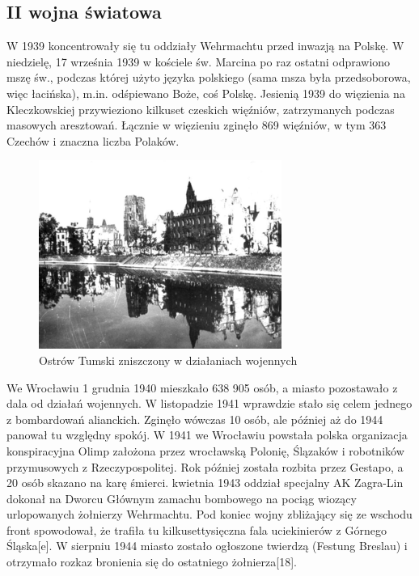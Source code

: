 \documentclass{article}
\begin{document}
\subsection{II wojna światowa}
W 1939 koncentrowały się tu oddziały Wehrmachtu przed inwazją na Polskę.
\bigskip
\newline
W niedzielę, 17 września 1939 w kościele św. Marcina po raz ostatni odprawiono mszę św., podczas której użyto języka polskiego (sama msza była przedsoborowa, więc łacińska), m.in. odśpiewano Boże, coś Polskę.
\bigskip
\newline
Jesienią 1939 do więzienia na Kleczkowskiej przywieziono kilkuset czeskich więźniów, zatrzymanych podczas masowych aresztowań. Łącznie w więzieniu zginęło 869 więźniów, w tym 363 Czechów i znaczna liczba Polaków.
\bigskip
\newline
\begin{figure}[h]
\centering
\includegraphics[scale=0.7]{13.png}
\caption{Ostrów Tumski zniszczony w działaniach wojennych}
\end{figure}
\bigskip
\newline
We Wrocławiu 1 grudnia 1940 mieszkało 638 905 osób, a miasto pozostawało z dala od działań wojennych. W listopadzie 1941 wprawdzie stało się celem jednego z bombardowań alianckich. Zginęło wówczas 10 osób, ale później aż do 1944 panował tu względny spokój.
\bigskip
\newline
W 1941 we Wrocławiu powstała polska organizacja konspiracyjna Olimp założona przez wrocławską Polonię, Ślązaków i robotników przymusowych z Rzeczypospolitej. Rok później została rozbita przez Gestapo, a 20 osób skazano na karę śmierci.
\bigskip
{} kwietnia 1943 oddział specjalny AK Zagra-Lin dokonał na Dworcu Głównym zamachu bombowego na pociąg wiozący urlopowanych żołnierzy Wehrmachtu.
\bigskip
\newline
Pod koniec wojny zbliżający się ze wschodu front spowodował, że trafiła tu kilkusettysięczna fala uciekinierów z Górnego Śląska[e]. W sierpniu 1944 miasto zostało ogłoszone twierdzą (Festung Breslau) i otrzymało rozkaz bronienia się do ostatniego żołnierza[18].
\end{document}
